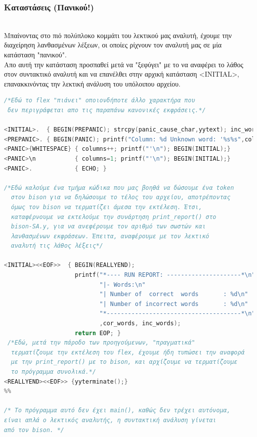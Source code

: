 \documentclass[14pt]{extarticle}
\begin{document}
\subsubsection{Καταστάσεις (Πανικού!)}
\\
Μπαίνοντας στο πιό πολύπλοκο κομμάτι του λεκτικού μας αναλυτή, έχουμε την
διαχείρηση λανθασμένων λέξεων, οι οποίες ρίχνουν τον αναλυτή μας σε μία κατάσταση
"πανικού".
\\
Απο αυτή την κατάσταση προσπαθεί μετά να "ξεφύγει" με το να αναφέρει το λάθος στον συντακτικό
αναλυτή και να επανέλθει στην αρχική κατάσταση <INITIAL>, επανακκινόντας την λεκτική ανάλυση του
υπόλοιπου αρχείου.
\begin{lstlisting}[language=C]
/*Εδώ το flex "πιάνει" οποιονδήποτε άλλο χαρακτήρα που 
 δεν περιγράφεται απο τις παραπάνω κανονικές εκφράσεις.*/

<INITIAL>.  { BEGIN(PREPANIC); strcpy(panic_cause_char,yytext); inc_words++; return UNKNOWN;}
<PREPANIC>. { BEGIN(PANIC); printf("Column: %d Unknown word: '%s%s",columns,panic_cause_char,yytext);}
<PANIC>{WHITESPACE} { columns++; printf("'\n"); BEGIN(INITIAL);}
<PANIC>\n           { columns=1; printf("'\n"); BEGIN(INITIAL);}
<PANIC>.            { ECHO; }

/*Εδώ καλούμε ένα τμήμα κώδικα που μας βοηθά να δώσουμε ένα token
  στον bison για να δηλώσουμε το τέλος του αρχείου, αποτρέποντας
  όμως τον bison να τερματίζει άμεσα την εκτέλεση. Έτσι,
  καταφέρνουμε να εκτελούμε την συνάρτηση print_report() στο
  bison-SA.y, για να ανεφέρουμε τον αριθμό των σωστών και
  λανθασμένων εκφράσεων. Έπειτα, αναφέρουμε με τον λεκτικό 
  αναλυτή τις λάθος λέξεις*/

<INITIAL><<EOF>>  { BEGIN(REALLYEND);
                    printf("*---- RUN REPORT: ---------------------*\n"
                           "|- Words:\n"
                           "| Number of  correct  words       : %d\n"
                           "| Number of incorrect words       : %d\n"
                           "*--------------------------------------*\n"
                           ,cor_words, inc_words);
                    return EOP; }
 /*Εδώ, μετά την πάροδο των προηγούμενων, "πραγματικά"
  τερματίζουμε την εκτέλεση του flex, έχουμε ήδη τυπώσει την αναφορά
  με την print_report() με το bison, και αρχίζουμε να τερματίζουμε
  το πρόγραμμα συνολικά.*/
<REALLYEND><<EOF>> {yyterminate();}
%%

/* Το πρόγραμμα αυτό δεν έχει main(), καθώς δεν τρέχει αυτόνομα,
είναι απλά ο λεκτικός αναλυτής, η συντακτική ανάλυση γίνεται
από τον bison. */

\end{lstlisting}
\end{document}
